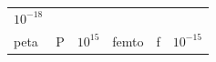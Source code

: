 {\begin{center}
\begin{xtabular*}{\mytablewidth}[t]{|p{10\mystarwidth}|p{10\mystarwidth}|p{10\mystarwidth}|p{10\mystarwidth}|p{10\mystarwidth}|p{10\mystarwidth}|}
    
        
                \begin{math}{10}^{-18}\end{math}
     \tabularnewline{}
    
    
        peta &
    
    
        P &
    
    
        
                \begin{math}{10}^{15}\end{math}
               &
    
    
        femto &
    
    
        f &
    
    
        
                \begin{math}{10}^{-15}\end{math}
     \tabularnewline{}
    

\end{xtabular*}
\end{center}}
